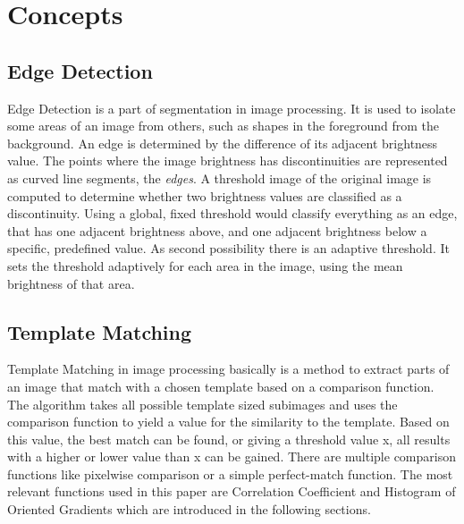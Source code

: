 \section{Concepts}
\label{sec_concepts}

\subsection{Edge Detection}
Edge Detection is a part of segmentation in image processing.
It is used to isolate some areas of an image from others, such as shapes in the foreground from the background.
An edge is determined by the difference of its adjacent brightness value.
The points where the image brightness has discontinuities are represented as curved line segments, the \textit{edges}.
A threshold image of the original image is computed to determine whether two brightness values are classified as a discontinuity.
Using a global, fixed threshold would classify everything as an edge, that has one adjacent brightness above, and one adjacent brightness below a specific, predefined value.
As second possibility there is an adaptive threshold.
It sets the threshold adaptively for each area in the image, using the mean brightness of that area.


\subsection{Template Matching}
Template Matching in image processing basically is a method to extract parts of an image that match with a chosen template based on a comparison function.
The algorithm takes all possible template sized subimages and uses the comparison function to yield a value for the similarity to the template.
Based on this value, the best match can be found, or giving a threshold value x, all results with a higher or lower value than x can be gained.
There are multiple comparison functions like pixelwise comparison or a simple perfect-match function.
The most relevant functions used in this paper are Correlation Coefficient and Histogram of Oriented Gradients which are introduced in the following sections.

